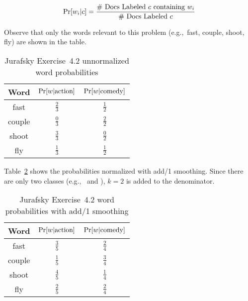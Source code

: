 \begin{equation}\label{eq:P02:BernoulliWordProb}
  \Pr\lbrack w_i \vert c\rbrack = \frac{\text{\# Docs Labeled } c \text{ containing } w_i}{\text{\# Docs Labeled } c}
\end{equation}

\noindent
Observe that only the words relevant to this problem (e.g.,~fast, couple, shoot, fly) are shown in the table.

\begin{table}[h]
  \centering
  \caption{Jurafsky Exercise~4.2 unnormalized word probabilities}\label{tab:P02:UnnormalWordProb}
  \begin{tabular}{|c||c|c|}
    \hline
    \textbf{Word}  & $\Pr\lbrack w \vert \text{action}\rbrack$ & $\Pr\lbrack w \vert \text{comedy}\rbrack$ \\\hline\hline
    fast           &  $\frac{2}{3}$  &  $\frac{1}{2}$ \\\hline
    couple         &  $\frac{0}{3}$  &  $\frac{2}{2}$ \\\hline
    shoot          &  $\frac{3}{3}$  &  $\frac{0}{2}$ \\\hline
    fly            &  $\frac{1}{3}$  &  $\frac{1}{2}$ \\\hline
  \end{tabular}
\end{table}

Table~\ref{tab:P02:NormalWordProb} shows the probabilities normalized with add\-/1 smoothing.  Since there are only two classes (e.g.,~ and ), ${k=2}$ is added to the denominator.

\begin{table}[h]
  \centering
  \caption{Jurafsky Exercise~4.2 word probabilities with add\-/1 smoothing}\label{tab:P02:NormalWordProb}
  \begin{tabular}{|c||c|c|}
    \hline
    \textbf{Word}  & $\Pr\lbrack w \vert \text{action}\rbrack$ & $\Pr\lbrack w \vert \text{comedy}\rbrack$ \\\hline\hline
    fast           &  $\frac{3}{5}$  &  $\frac{2}{4}$ \\\hline
    couple         &  $\frac{1}{5}$  &  $\frac{3}{4}$ \\\hline
    shoot          &  $\frac{4}{5}$  &  $\frac{1}{4}$ \\\hline
    fly            &  $\frac{2}{5}$  &  $\frac{2}{4}$ \\\hline
  \end{tabular}
\end{table}

